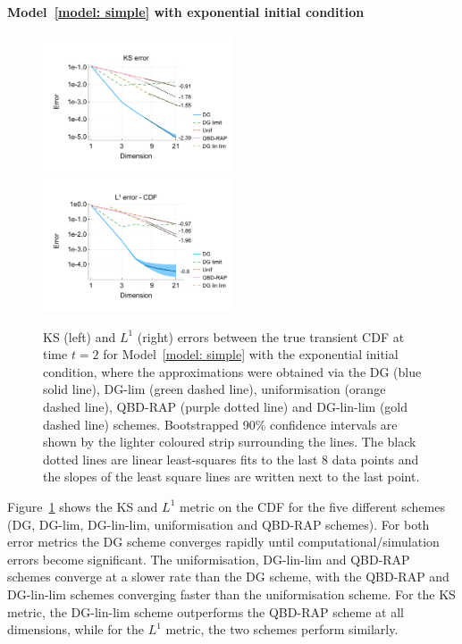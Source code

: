 \paragraph{Model~\ref{model: simple} with exponential initial condition}
\begin{figure}[h]
	\centering
	\includegraphics[width=0.5\textwidth,trim={0.75cm 0.8cm 0.25cm 1.25cm},clip]{chapter6/figs/hitting_times_model/reflecting_model/transient_distribution/exp/ks_error_formatted.pdf}%
	\includegraphics[width=0.5\textwidth,trim={0.75cm 0.8cm 0.25cm 1.25cm},clip]{chapter6/figs/hitting_times_model/reflecting_model/transient_distribution/exp/l1_cdf_error_formatted.pdf}
	\caption{KS (left) and \(L^1\) (right) errors between the true transient CDF at time \(t=2\) for Model~\ref{model: simple} with the exponential initial condition, where the approximations were obtained via the DG (blue solid line), DG-lim (green dashed line), uniformisation (orange dashed line), QBD-RAP (purple dotted line) and DG-lin-lim (gold dashed line) schemes. Bootstrapped 90\% confidence intervals are shown by the lighter coloured strip surrounding the lines. The black dotted lines are linear least-squares fits to the last 8 data points and the slopes of the least square lines are written next to the last point.} 
	\label{fig: reflecting transient exp} 
\end{figure}
Figure~\ref{fig: reflecting transient exp} shows the KS and \(L^1\) metric on the CDF for the five different schemes (DG, DG-lim, DG-lin-lim, uniformisation and QBD-RAP schemes). For both error metrics the DG scheme converges rapidly until computational/simulation errors become significant. The uniformisation, DG-lin-lim and QBD-RAP schemes converge at a slower rate than the DG scheme, with the QBD-RAP and DG-lin-lim schemes converging faster than the uniformisation scheme. For the KS metric, the DG-lin-lim scheme outperforms the QBD-RAP scheme at all dimensions, while for the \(L^1\) metric, the two schemes perform similarly. 

